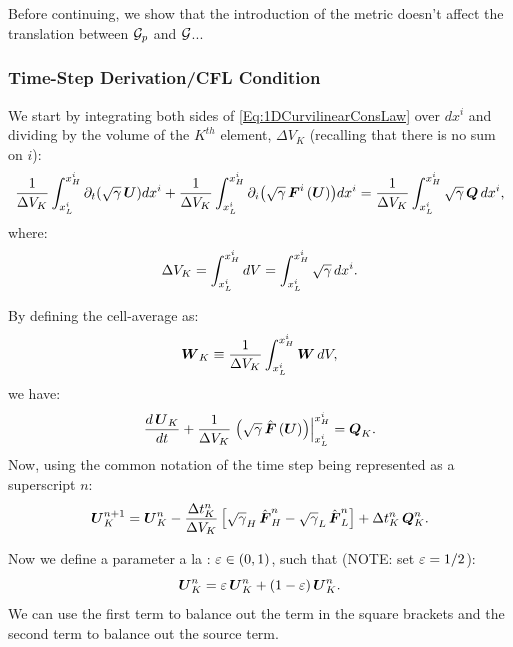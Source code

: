 \documentclass[10pt,preprint]{aastex}
\begin{document}
Before continuing, we show that the introduction of the metric doesn't affect the translation between $\cG_{p}$ and $\cG$...

\subsubsection{Time-Step Derivation/CFL Condition}
We start by integrating both sides of \eqref{Eq:1DCurvilinearConsLaw} over $dx^{i}$ and dividing by the volume of the $K^{th}$ element, $\Delta V_{K}$ (recalling that there is no sum on $i$):
\begin{equation}
    \f{1}{\Delta V_{K}}\int_{x^{i}_{L}}^{x^{i}_{H}}\pd{\left(\sqrtgm\,\bU\right)}{t}dx^{i}+\f{1}{\Delta V_{K}}\int_{x^{i}_{L}}^{x^{i}_{H}}\pd{\left(\sqrtgm\,\bF^{i}\left(\bU\right)\right)}{i}dx^{i}=\f{1}{\Delta V_{K}}\int_{x^{i}_{L}}^{x^{i}_{H}}\sqrtgm\,\bQ\,dx^{i},
\end{equation}
where:
\begin{equation}
    \Delta V_{K}=\int_{x^{i}_{L}}^{x^{i}_{H}}dV=\int_{x^{i}_{L}}^{x^{i}_{H}}\sqrtgm\,dx^{i}.
\end{equation}

By defining the cell-average as:
\begin{equation}
    \bW_{K}\equiv\f{1}{\Delta V_{K}}\int_{x^{i}_{L}}^{x^{i}_{H}}\bW\,dV,
\end{equation}
we have:
\begin{equation}
    \f{d\,\bU_{K}}{dt}+\f{1}{\Delta V_{K}}\left.\left(\sqrtgm\,\hat{\bF}\left(\bU\right)\right)\right|^{x^{i}_{H}}_{x^{i}_{L}}=\bQ_{K}.
\end{equation}
Now, using the common notation of the time step being represented as a superscript $n$:
\begin{equation}
    \bU^{n+1}_{K}=\bU^{n}_{K}-\f{\Delta t^{n}_{K}}{\Delta V_{K}}\left[\sqrtgm_{H}\,\hat{\bF}^{n}_{H}-\sqrtgm_{L}\,\hat{\bF}^{n}_{L}\right]+\Delta t^{n}_{K}\,\bQ^{n}_{K}.
\end{equation}

Now we define a parameter a la \citet{ZS2011b}: $\ve\in\left(0,1\right)$, such that (NOTE: \citet{ZS2011b} set $\ve=1/2$):
\begin{equation}
    \bU^{n}_{K}=\ve\,\bU^{n}_{K}+\left(1-\ve\right)\bU^{n}_{K}.
\end{equation}
We can use the first term to balance out the term in the square brackets and the second term to balance out the source term.
\end{document}
